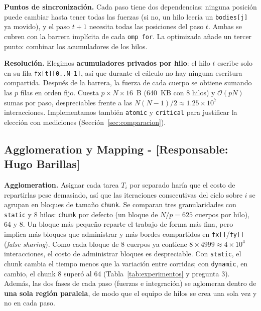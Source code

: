 \documentclass[11pt,a4paper]{article}
\begin{document}
\textbf{Puntos de sincronización.} Cada paso tiene dos dependencias: ninguna posición puede cambiar hasta tener todas las fuerzas (si no, un hilo leería un \texttt{bodies[j]} ya movido), y el paso $t+1$ necesita todas las posiciones del paso $t$. Ambas se cubren con la barrera implícita de cada \texttt{omp for}. La optimizada añade un tercer punto: combinar los acumuladores de los hilos.

\textbf{Resolución.} Elegimos \textbf{acumuladores privados por hilo}: el hilo $t$ escribe solo en su fila \texttt{fx[t][0..N-1]}, así que durante el cálculo no hay ninguna escritura compartida. Después de la barrera, la fuerza de cada cuerpo se obtiene sumando las $p$ filas en orden fijo. Cuesta $p \times N \times 16$~B (640~KB con 8 hilos) y $\mathcal{O}(pN)$ sumas por paso, despreciables frente a las $N(N-1)/2 \approx 1.25 \times 10^7$ interacciones. Implementamos también \texttt{atomic} y \texttt{critical} para justificar la elección con mediciones (Sección~\ref{sec:comparacion}).

\subsection{Agglomeration y Mapping - [Responsable: Hugo Barillas]}
\textbf{Agglomeration.} Asignar cada tarea $T_i$ por separado haría que el costo de repartirlas pese demasiado, así que las iteraciones consecutivas del ciclo sobre $i$ se agrupan en bloques de tamaño \texttt{chunk}. Se comparan tres granularidades con \texttt{static} y 8 hilos: \texttt{chunk} por defecto (un bloque de $N/p = 625$ cuerpos por hilo), 64 y 8. Un bloque más pequeño reparte el trabajo de forma más fina, pero implica más bloques que administrar y más bordes compartidos en \texttt{fx[]}/\texttt{fy[]} (\textit{false sharing}). Como cada bloque de 8 cuerpos ya contiene $8 \times 4999 \approx 4\times10^4$ interacciones, el costo de administrar bloques es despreciable. Con \texttt{static}, el chunk cambia el tiempo menos que la variación entre corridas; con \texttt{dynamic}, en cambio, el chunk 8 superó al 64 (Tabla~\ref{tab:experimentos} y pregunta 3). Además, las dos fases de cada paso (fuerzas e integración) se aglomeran dentro de \textbf{una sola región paralela}, de modo que el equipo de hilos se crea una sola vez y no en cada paso.
\end{document}
